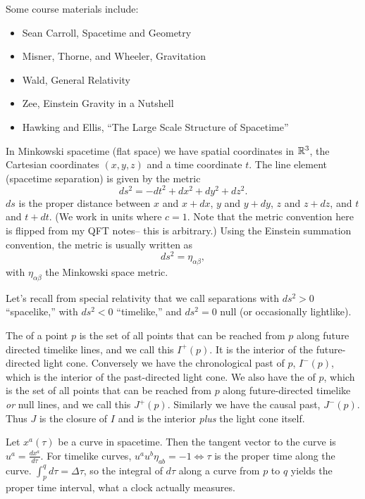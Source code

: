 Some course materials include:
\begin{itemize}
\item Sean Carroll, Spacetime and Geometry
\item Misner, Thorne, and Wheeler, Gravitation
\item Wald, General Relativity
\item Zee, Einstein Gravity in a Nutshell
\item Hawking and Ellis, ``The Large Scale Structure of Spacetime''
\end{itemize}

In Minkowski spacetime (flat space) we have spatial coordinates in $\mathbb{R}^3$, the Cartesian coordinates $(x,y,z)$ and a time coordinate $t$. The line element (spacetime separation) is given by the metric
$$ds^2=-dt^2+dx^2+dy^2+dz^2.$$
$ds$ is the proper distance between $x$ and $x+dx$, $y$ and $y+dy$, $z$ and $z+dz$, and $t$ and $t+dt$. (We work in units where $c=1$. Note that the metric convention here is flipped from my QFT notes-- this is arbitrary.) Using the Einstein summation convention, the metric is usually written as $$ds^2=\eta_{\alpha\beta},$$ with $\eta_{\alpha\beta}$ the Minkowski space metric.

Let's recall from special relativity that we call separations with $ds^2>0$ ``spacelike,'' with $ds^2<0$ ``timelike,'' and $ds^2=0$ null (or occasionally lightlike).
\begin{defn}
The  of a point $p$ is the set of all points that can be reached from $p$ along future directed timelike lines, and we call this $I^+(p)$. It is the interior of the future-directed light cone. Conversely we have the chronological past of $p$, $I^-(p)$, which is the interior of the past-directed light cone. We also have the  of $p$, which is the set of all points that can be reached from $p$ along future-directed timelike \emph{or} null lines, and we call this $J^+(p)$. Similarly we have the causal past, $J^-(p)$. Thus $J$ is the closure of $I$ and is the interior \emph{plus} the light cone itself.
\end{defn}

Let $x^a(\tau)$ be a curve in spacetime. Then the tangent vector to the curve is $u^a=\frac{dx^a}{d\tau}$. For timelike curves, $u^a u^b \eta_{ab}=-1 \iff \tau$ is the proper time along the curve. $\int_p^q d\tau = \Delta \tau$, so the integral of $d\tau$ along a curve from $p$ to $q$ yields the proper time interval, what a clock actually measures.

